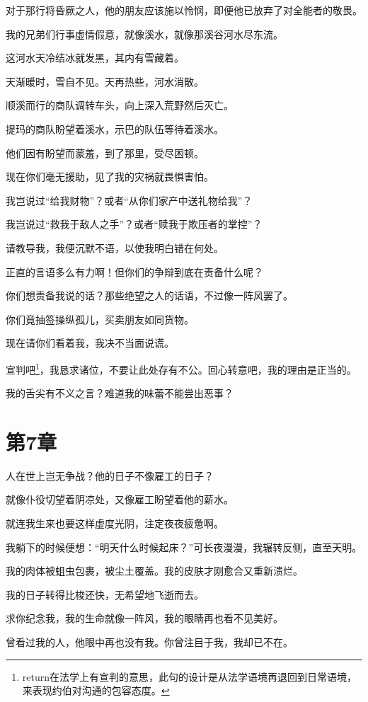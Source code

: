\documentclass[12pt,oneside]{book}
\begin{document}
对于那行将昏厥之人，他的朋友应该施以怜悯，即便他已放弃了对全能者的敬畏。

我的兄弟们行事虚情假意，就像溪水，就像那溪谷河水尽东流。

这河水天冷结冰就发黑，其内有雪藏着。

天渐暖时，雪自不见。天再热些，河水消散。

顺溪而行的商队调转车头，向上深入荒野然后灭亡。

提玛的商队盼望着溪水，示巴的队伍等待着溪水。

他们因有盼望而蒙羞，到了那里，受尽困顿。

现在你们毫无援助，见了我的灾祸就畏惧害怕。

我岂说过“给我财物”？或者“从你们家产中送礼物给我”？

我岂说过“救我于敌人之手”？或者“赎我于欺压者的掌控”？

请教导我，我便沉默不语，以使我明白错在何处。

正直的言语多么有力啊！但你们的争辩到底在责备什么呢？

你们想责备我说的话？那些绝望之人的话语，不过像一阵风罢了。

你们竟抽签操纵孤儿，买卖朋友如同货物。

现在请你们看着我，我决不当面说谎。

宣判吧\footnote{return在法学上有宣判的意思，此句的设计是从法学语境再退回到日常语境，来表现约伯对沟通的包容态度。}，我恳求诸位，不要让此处存有不公。回心转意吧，我的理由是正当的。

我的舌尖有不义之言？难道我的味蕾不能尝出恶事？



\chapter{第7章}
人在世上岂无争战？他的日子不像雇工的日子？

就像仆役切望着阴凉处，又像雇工盼望着他的薪水。

就连我生来也要这样虚度光阴，注定夜夜疲惫啊。

我躺下的时候便想：“明天什么时候起床？”可长夜漫漫，我辗转反侧，直至天明。

我的肉体被蛆虫包裹，被尘土覆盖。我的皮肤才刚愈合又重新溃烂。

我的日子转得比梭还快，无希望地飞逝而去。

求你纪念我，我的生命就像一阵风，我的眼睛再也看不见美好。

曾看过我的人，他眼中再也没有我。你曾注目于我，我却已不在。
\end{document}
